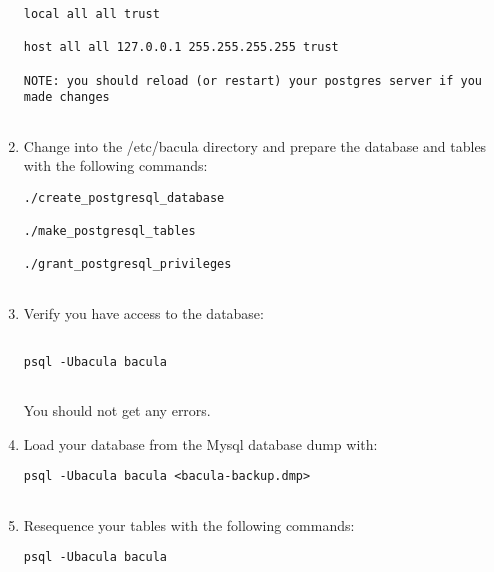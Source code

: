 \begin{enumerate}
\footnotesize
\begin{verbatim}
local all all trust
                
host all all 127.0.0.1 255.255.255.255 trust
                
NOTE: you should reload (or restart) your postgres server if you  made changes
      
\end{verbatim}
\normalsize

\item Change into the /etc/bacula directory and prepare the database  and
   tables with the following commands:  

\footnotesize
\begin{verbatim}
./create_postgresql_database
                                
./make_postgresql_tables
                                
./grant_postgresql_privileges
       
\end{verbatim}
\normalsize

\item Verify you have access to the database:  

   \footnotesize
\begin{verbatim}
  
psql -Ubacula bacula
      
\end{verbatim}
\normalsize

You should not get any errors.  
\item Load your database from the Mysql database dump with:  

   \footnotesize
\begin{verbatim}
psql -Ubacula bacula <bacula-backup.dmp>
      
\end{verbatim}
\normalsize

\item Resequence your tables with the following commands:  

   \footnotesize
\begin{verbatim}
psql -Ubacula bacula
                

\end{verbatim}
\end{enumerate}
